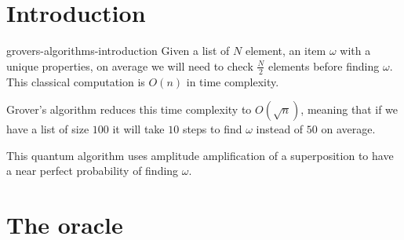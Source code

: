 \documentclass[preview]{standalone}
\begin{document}
\genpage

\section{Introduction}

\begin{snippet}{grovers-algorithms-introduction}
    Given a list of \(N\) element, an item \(\omega\) with a unique properties, on average we will need to check \(\frac{N}{2}\) elements before finding \(\omega\).
    This classical computation is \(O(n)\) in time complexity.

    Grover's algorithm reduces this time complexity to \(O(\sqrt{n})\), meaning that if we have a list of size \(100\) it will take \(10\) steps to find \(\omega\) instead of \(50\) on average.

    This quantum algorithm uses amplitude amplification of a superposition to have a near perfect probability of finding \(\omega\).
\end{snippet}

\section{The oracle}
\end{document}
